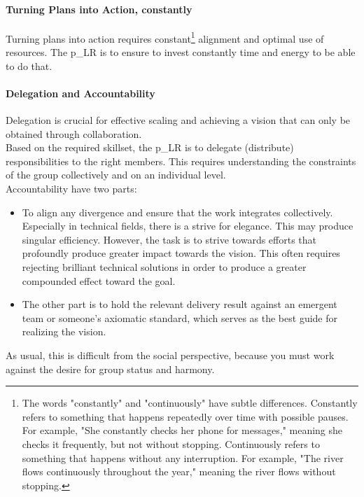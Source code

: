\paragraph{Turning Plans into Action, constantly}
Turning plans into action requires constant\footnote{
	The words "constantly" and "continuously" have subtle differences. Constantly refers to something that happens repeatedly over time with possible pauses. For example, "She constantly checks her phone for messages," meaning she checks it frequently, but not without stopping. Continuously refers to something that happens without any interruption. For example, "The river flows continuously throughout the year," meaning the river flows without stopping.
}
alignment and optimal use of resources. The \gls{p_LR} is to ensure to invest constantly time and energy to be able to do that.

\paragraph{Delegation and Accountability}
Delegation is crucial for effective scaling and achieving a vision that can only be obtained through collaboration.\\

Based on the required skillset, the \gls{p_LR} is to delegate (distribute) responsibilities to the right members. This requires understanding the constraints of the group collectively and on an individual level.\\

Accountability have two parts: 
\begin{itemize}
	\item To align any divergence and ensure that the work integrates collectively. Especially in technical fields, there is a strive for elegance. This may produce singular efficiency. However, the task is to strive towards efforts that profoundly produce greater impact towards the vision. This often requires rejecting brilliant technical solutions in order to produce a greater compounded effect toward the goal.
	\item The other part is to hold the relevant delivery result against an emergent team or someone's axiomatic standard, which serves as the best guide for realizing the vision.
\end{itemize}

As usual, this is difficult from the social perspective, because you must work against the desire for group status and harmony.\\

